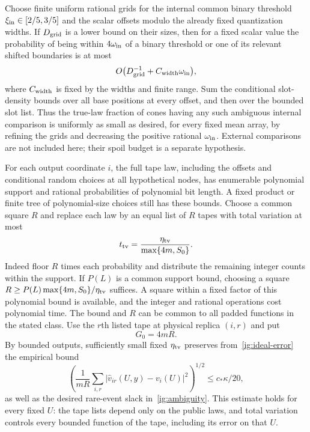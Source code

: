 Choose finite uniform rational grids for the internal common binary
threshold $\xi_{\rm in}\in[2/5,3/5]$ and the scalar offsets modulo the
already fixed quantization widths. If $D_{\rm grid}$ is a lower bound
on their sizes, then for a fixed scalar value the probability of being
within $4\omega_{\rm in}$ of a binary threshold or one of its relevant
shifted boundaries is at most
\begin{equation}\label{ig:ambiguity}
 O\bigl(D_{\rm grid}^{-1}+C_{\rm width}\omega_{\rm in}\bigr),
\end{equation}
where $C_{\rm width}$ is fixed by the widths and finite range. Sum the
conditional slot-density bounds over all base positions at every offset,
and then over the bounded slot list. Thus the true-law fraction of cones
having any such ambiguous internal comparison is uniformly as small as
desired, for every fixed mean array, by refining the grids and decreasing
the positive rational $\omega_{\rm in}$. External comparisons are not
included here; their spoil budget is a separate hypothesis.

For each output coordinate $i$, the full tape law, including the offsets
and conditional random choices at all hypothetical nodes, has enumerable
polynomial support and rational probabilities of polynomial bit length.
A fixed product or finite tree of polynomial-size choices still has
these bounds. Choose a common square $R$ and replace each law by an equal
list of $R$ tapes with total variation at most
\begin{equation}\label{ig:tv}
 t_{\rm tv}=\frac{\eta_{\rm tv}}{\max\{4m,S_0\}}.
\end{equation}
Indeed floor $R$ times each probability and distribute the remaining
integer counts within the support. If $P(L)$ is a common support bound,
choosing a square $R\ge P(L)\max\{4m,S_0\}/\eta_{\rm tv}$ suffices.
A square within a fixed factor of this polynomial bound is available,
and the integer and rational operations cost polynomial time. The bound
and $R$ can be common to all padded functions in the stated class.
Use the $r$th listed tape at physical replica $(i,r)$ and put
\begin{equation}\label{ig:gscale}
 G_0=4mR.
\end{equation}
By bounded outputs, sufficiently small fixed $\eta_{\rm tv}$ preserves
from~\eqref{ig:ideal-error} the empirical bound
\begin{equation}\label{ig:empirical-error}
 \left(\frac1{mR}\sum_{i,r}
       |\widehat v_{ir}(U,y)-v_i(U)|^2\right)^{1/2}
       \le c_*\kappa/20,
\end{equation}
as well as the desired rare-event slack in~\eqref{ig:ambiguity}.
This estimate holds for every fixed $U$: the tape lists depend only on
the public laws, and total variation controls every bounded function of
the tape, including its error on that $U$.

